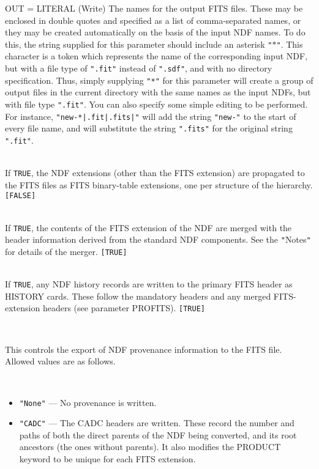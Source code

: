 \documentclass[twoside,11pt]{article}
\newcommand{\latex}[1]{#1}
\newcommand{\sstsubsection}[1]{ \item[{#1}] \mbox{} \\}
\newcommand{\ssthitemlist}[1]{
  \latex{
  \mbox{} \\
  \vspace{-3.5ex}
  }
  \begin{itemize}
     #1
  \end{itemize}
}
\newcommand{\sstitem}{\item}
\newcommand{\sstsubsection}[1]{\item[{#1}]}
\newcommand{\sstitem}{\item}
\begin{document}
{{{         OUT = LITERAL (Write)
      }{
         The names for the output FITS files.  These may be enclosed in double
         quotes and specified as a list of comma-separated names, or they may
         be created automatically on the basis of the input NDF names. To do
         this, the string supplied for this parameter should include an
         asterisk \texttt{"$*$"}. This character is a token which represents
         the name of the corresponding input NDF, but with a file type of
         \texttt{".fit"} instead of \texttt{".sdf"}, and with no directory
         specification. Thus, simply supplying \texttt{"*"} for this parameter
         will create a group of output files in the current directory with the 
         same names as the input NDFs, but with file type \texttt{".fit"}. 
         You can also specify some simple editing to be performed. For instance,
         \texttt{"new-*|.fit|.fits|"} will add the string \texttt{"new-"} to
         the start of every file name, and will substitute the string
         \texttt{".fits"} for the original string \texttt{".fit"}.
      }
      \sstsubsection{
         PROEXTS = \_LOGICAL (Read)
      }{
         If \texttt{TRUE}, the NDF extensions (other than the FITS extension)
         are propagated to the FITS files as FITS binary-table
         extensions, one per structure of the hierarchy. \texttt{[FALSE]}
      }
      \sstsubsection{
         PROFITS = \_LOGICAL (Read)
      }{
         If \texttt{TRUE}, the contents of the FITS extension of the NDF are
         merged with the header information derived from the standard
         NDF components.  See the \texttt{"}Notes\texttt{"} for details of the merger.
         \texttt{[TRUE]}
      }
      \sstsubsection{
         PROHIS = \_LOGICAL (Read)
      }{
         If \texttt{TRUE}, any NDF history records are written to the primary
         FITS header as HISTORY cards.  These follow the mandatory
         headers and any merged FITS-extension headers (see parameter
         PROFITS). \texttt{[TRUE]}
      }
      \sstsubsection{
         PROVENANCE = LITERAL (Read)
      }{
         This controls the export of NDF provenance information to the 
         FITS file.  Allowed values are as follows.
         \ssthitemlist{

            \sstitem  
            \texttt{"None"} --- No provenance is written.

            \sstitem
            \texttt{"CADC"} --- The CADC headers are written.  These
	    record the number and paths of both the direct parents
	    of the NDF being converted, and its root ancestors (the
	    ones without parents).  It also modifies the PRODUCT 
            keyword to be unique for each FITS extension.
 
}}}}
\end{document}
